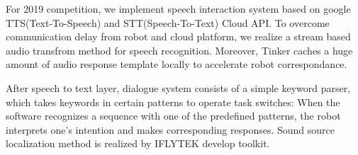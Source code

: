 For 2019 competition, we implement speech interaction system based on google TTS(Text-To-Speech) and STT(Speech-To-Text) Cloud API. To overcome communication delay from robot and cloud platform, we realize a stream based audio transfrom method for speech recognition. Moreover, Tinker caches a huge amount of audio response template locally to accelerate robot correspondance.

After speech to text layer, dialogue system consists of a simple keyword parser, which takes keywords in certain patterns to operate task switches: When the software recognizes a sequence with one of the predefined patterns, the robot interprets one's intention and makes corresponding responses. Sound source localization method is realized by IFLYTEK develop toolkit.

